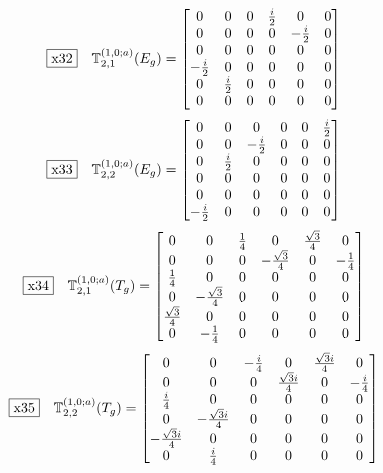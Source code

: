 \documentclass[fleqn,10pt,landscape]{jsarticle}
\begin{document}
\begin{dmath*}
\fbox{x32}\quad \mathbb{T}_{2,1}^{(1,0;a)}(E_{g})=\begin{bmatrix} 0 & 0 & 0 & \frac{i}{2} & 0 & 0 \\ 0 & 0 & 0 & 0 & - \frac{i}{2} & 0 \\ 0 & 0 & 0 & 0 & 0 & 0 \\ - \frac{i}{2} & 0 & 0 & 0 & 0 & 0 \\ 0 & \frac{i}{2} & 0 & 0 & 0 & 0 \\ 0 & 0 & 0 & 0 & 0 & 0 \end{bmatrix}
\end{dmath*}
\begin{dmath*}
\fbox{x33}\quad \mathbb{T}_{2,2}^{(1,0;a)}(E_{g})=\begin{bmatrix} 0 & 0 & 0 & 0 & 0 & \frac{i}{2} \\ 0 & 0 & - \frac{i}{2} & 0 & 0 & 0 \\ 0 & \frac{i}{2} & 0 & 0 & 0 & 0 \\ 0 & 0 & 0 & 0 & 0 & 0 \\ 0 & 0 & 0 & 0 & 0 & 0 \\ - \frac{i}{2} & 0 & 0 & 0 & 0 & 0 \end{bmatrix}
\end{dmath*}
\begin{dmath*}
\fbox{x34}\quad \mathbb{T}_{2,1}^{(1,0;a)}(T_{g})=\begin{bmatrix} 0 & 0 & \frac{1}{4} & 0 & \frac{\sqrt{3}}{4} & 0 \\ 0 & 0 & 0 & - \frac{\sqrt{3}}{4} & 0 & - \frac{1}{4} \\ \frac{1}{4} & 0 & 0 & 0 & 0 & 0 \\ 0 & - \frac{\sqrt{3}}{4} & 0 & 0 & 0 & 0 \\ \frac{\sqrt{3}}{4} & 0 & 0 & 0 & 0 & 0 \\ 0 & - \frac{1}{4} & 0 & 0 & 0 & 0 \end{bmatrix}
\end{dmath*}
\begin{dmath*}
\fbox{x35}\quad \mathbb{T}_{2,2}^{(1,0;a)}(T_{g})=\begin{bmatrix} 0 & 0 & - \frac{i}{4} & 0 & \frac{\sqrt{3} i}{4} & 0 \\ 0 & 0 & 0 & \frac{\sqrt{3} i}{4} & 0 & - \frac{i}{4} \\ \frac{i}{4} & 0 & 0 & 0 & 0 & 0 \\ 0 & - \frac{\sqrt{3} i}{4} & 0 & 0 & 0 & 0 \\ - \frac{\sqrt{3} i}{4} & 0 & 0 & 0 & 0 & 0 \\ 0 & \frac{i}{4} & 0 & 0 & 0 & 0 \end{bmatrix}
\end{dmath*}
\end{document}
